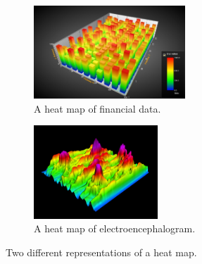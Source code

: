 \documentclass[
	fontsize=11pt
	headlines=2,
	footlines=2,
	parskip=half
]{scrartcl}
\newcommand{\subfigcaptionskip}{\vspace{-10pt}}
\begin{document}
{		\newcommand{\heatmapwidth}{0.4\textwidth}
		\newcommand{\heatmapheight}{3.5cm}
		\begin{figure}[H]
			\centering
			\begin{subfigure}[b]{\heatmapwidth}
                \includegraphics[width=\textwidth,height=\heatmapheight]{images/heat-map-1}
                \caption{A heat map of financial data. \protect\footnotemark}
                \label{fig:heat_map_financial}
	        \end{subfigure}
	        \begin{subfigure}[b]{\heatmapwidth}
                \includegraphics[width=\textwidth,height=\heatmapheight]{images/heat-map-2}
                \caption{A heat map of electroencephalogram. \protect\footnotemark}
                \label{fig:heat_map_eeg}
	        \end{subfigure}
			\caption{Two different representations of a heat map.}
			\subfigcaptionskip
			\label{fig:heat_maps}
		\end{figure}

}
\end{document}

